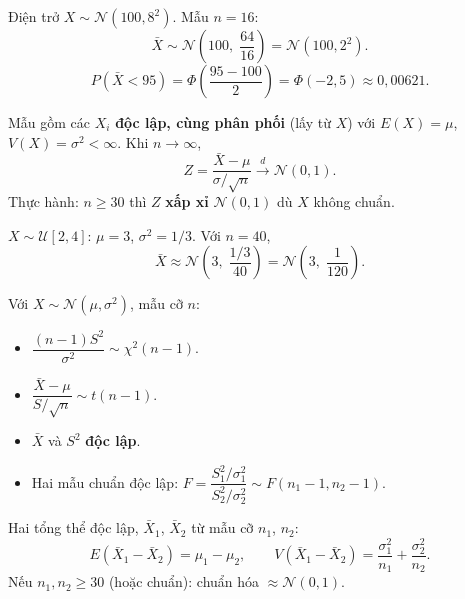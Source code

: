 \documentclass[12pt,a4paper]{article}
\begin{document}
\begin{vidu}[title={Điện trở - xác suất trung bình mẫu $< 95\,\Omega$}]
Điện trở $X \sim \mathcal{N}(100, 8^2)$. Mẫu $n=16$:
\[
  \bar{X} \sim \mathcal{N}\!\left(100,\; \dfrac{64}{16}\right) = \mathcal{N}(100, 2^2).
\]
\[
  P(\bar{X} < 95) = \Phi\!\left(\dfrac{95-100}{2}\right) = \Phi(-2{,}5) \approx 0{,}00621.
\]
\end{vidu}

\begin{dinhly}[title={Định lý giới hạn trung tâm (CLT)}]
  Mẫu gồm các $X_i$ \textbf{độc lập, cùng phân phối} (lấy từ $X$) với $E(X)=\mu$, $V(X)=\sigma^2 < \infty$. Khi $n \to \infty$,
  \[
    Z = \dfrac{\bar{X} - \mu}{\sigma/\sqrt{n}} \xrightarrow{d} \mathcal{N}(0,1).
  \]
  Thực hành: $n \ge 30$ thì $Z$ \textbf{xấp xỉ} $\mathcal{N}(0,1)$ dù $X$ không chuẩn.
\end{dinhly}

\begin{vidu}[title={CLT - phân phối đều}]
$X \sim \mathcal{U}[2,4]$: $\mu = 3$, $\sigma^2 = 1/3$. Với $n=40$,
\[
  \bar{X} \approx \mathcal{N}\!\left(3,\; \dfrac{1/3}{40}\right) = \mathcal{N}\!\left(3,\; \dfrac{1}{120}\right).
\]
\end{vidu}

\begin{dinhly}[title={Phân phối $\chi^2$, $t$ (Student), $F$ (Fisher)}]
  Với $X \sim \mathcal{N}(\mu, \sigma^2)$, mẫu cỡ $n$:
  \begin{itemize}
    \item $\dfrac{(n-1)S^2}{\sigma^2} \sim \chi^2(n-1)$.
    \item $\dfrac{\bar{X}-\mu}{S/\sqrt{n}} \sim t(n-1)$.
    \item $\bar{X}$ và $S^2$ \textbf{độc lập}.
    \item Hai mẫu chuẩn độc lập: $F = \dfrac{S_1^2/\sigma_1^2}{S_2^2/\sigma_2^2} \sim F(n_1-1, n_2-1)$.
  \end{itemize}
\end{dinhly}

\begin{congthuc}[title={Phân phối mẫu $\bar{X}_1 - \bar{X}_2$}]
  Hai tổng thể độc lập, $\bar{X}_1$, $\bar{X}_2$ từ mẫu cỡ $n_1$, $n_2$:
  \[
    E(\bar{X}_1 - \bar{X}_2) = \mu_1 - \mu_2, \qquad
    V(\bar{X}_1 - \bar{X}_2) = \dfrac{\sigma_1^2}{n_1} + \dfrac{\sigma_2^2}{n_2}.
  \]
  Nếu $n_1, n_2 \ge 30$ (hoặc chuẩn): chuẩn hóa $\approx \mathcal{N}(0,1)$.
\end{congthuc}
\end{document}

